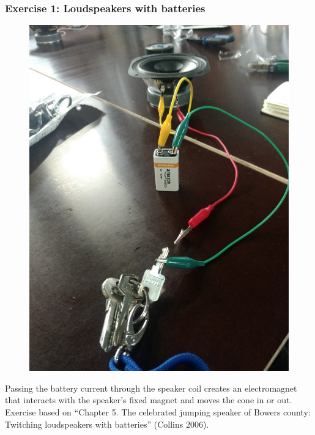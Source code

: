 \documentclass[screen, aspectratio=43]{beamer}
\begin{document}
\begin{frame}
  \frametitle{Exercise 1: Loudspeakers with batteries}
   \begin{figure}
	\includegraphics[scale=0.2]{img/loudspeakers-batteries.png}
\end{figure}
{\scriptsize 
Passing the battery current through the speaker coil creates an electromagnet that interacts with the speaker's fixed magnet and moves the cone in or out.\\
}    
{\tiny
Exercise based on ``Chapter 5. The celebrated jumping speaker of Bowers county: Twitching loudspeakers with batteries'' (Collins 2006).
}
\end{frame}
%
\end{document}
